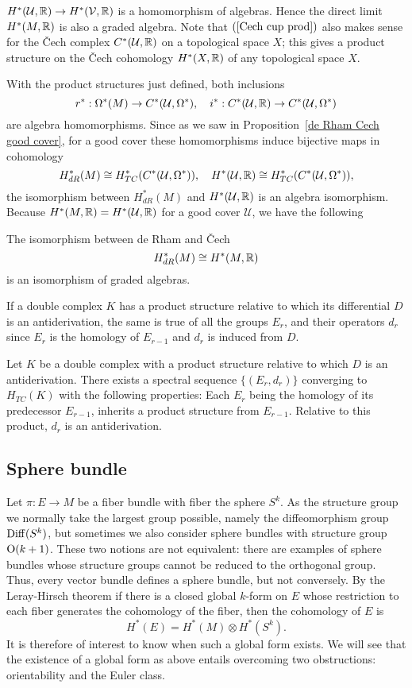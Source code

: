 $H^*(\mathcal{U},\mathbb{R})\to H^*(\mathcal{V},\mathbb{R})$ is a homomorphism of algebras. Hence the direct limit $H^*(M,\mathbb{R})$ is also a graded algebra. Note that $(\ref{Cech cup prod})$ 
also makes sense for the \v{C}ech complex $C^*(\mathcal{U},\mathbb{R})$ on a topological space $X$; this gives a product structure on the \v{C}ech cohomology $H^*(X,\mathbb{R})$ of any 
topological space $X$.\par
With the product structures just defined, both inclusions
\[r^*:\Omega^*(M)\to C^*(\mathcal{U},\Omega^*),\quad i^*:C^*(\mathcal{U},\mathbb{R})\to C^*(\mathcal{U},\Omega^*)\]
are algebra homomorphisms. Since as we saw in Proposition~\ref{de Rham Cech good cover}, for a good cover these homomorphisms induce bijective maps in cohomology
\[H^*_{dR}(M)\cong H^*_{TC}(C^*(\mathcal{U},\Omega^*)),\quad H^*(\mathcal{U},\mathbb{R})\cong H^*_{TC}(C^*(\mathcal{U},\Omega^*)),\]
the isomorphism between $H^*_{dR}(M)$ and $H^*(\mathcal{U},\mathbb{R})$ is an algebra isomorphism. Because $H^*(M,\mathbb{R})=H^*(\mathcal{U},\mathbb{R})$ for a good cover $\mathcal{U}$, we 
have the following
\begin{theorem}
The isomorphism between de Rham and \v{C}ech
\[H^*_{dR}(M)\cong H^*(M,\mathbb{R})\]
is an isomorphism of graded algebras.
\end{theorem}
If a double complex $K$ has a product structure relative to which its differential $D$ is an antiderivation, the same is true of all the groups $E_r$, and their 
operators $d_r$ since $E_r$ is the homology of $E_{r-1}$ and $d_r$ is induced from $D$.
\begin{proposition}
Let $K$ be a double complex with a product structure relative to which $D$ is an antiderivation. There exists a spectral sequence $\{(E_r,d_r)\}$ converging to $H_{TC}(K)$ 
with the following properties: Each $E_r$ being the homology of its predecessor $E_{r-1}$, inherits a product structure from $E_{r-1}$. Relative to this product, 
$d_r$ is an antiderivation.
\end{proposition}
\subsection{Sphere bundle}
Let $\pi:E\to M$ be a fiber bundle with fiber the sphere $S^k$. As the structure group we normally take the largest group possible, namely the diffeomorphism group $\mathrm{Diff}(S^k)$, 
but sometimes we also consider sphere bundles with structure group $\mathrm{O}(k+1)$. These two notions are not equivalent: there are examples of sphere bundles whose structure 
groups cannot be reduced to the orthogonal group. Thus, every vector bundle defines a sphere bundle, but not conversely. By the Leray-Hirsch theorem if there is a closed 
global $k$-form on $E$ whose restriction to each fiber generates the cohomology of the fiber, then the cohomology of $E$ is
\[H^*(E)=H^*(M)\otimes H^*(S^k).\]
It is therefore of interest to know when such a global form exists. We will see that the existence of a global form as above entails overcoming two obstructions: 
orientability and the Euler class.
